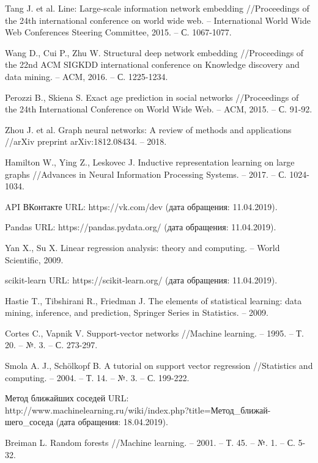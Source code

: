 \begin{thebibliography}{9}
Tang J. et al. Line: Large-scale information network embedding //Proceedings of the 24th international conference on world wide web. – International World Wide Web Conferences Steering Committee, 2015. – С. 1067-1077.

Wang D., Cui P., Zhu W. Structural deep network embedding //Proceedings of the 22nd ACM SIGKDD international conference on Knowledge discovery and data mining. – ACM, 2016. – С. 1225-1234.

Perozzi B., Skiena S. Exact age prediction in social networks //Proceedings of the 24th International Conference on World Wide Web. – ACM, 2015. – С. 91-92.

Zhou J. et al. Graph neural networks: A review of methods and applications //arXiv preprint arXiv:1812.08434. – 2018.

Hamilton W., Ying Z., Leskovec J. Inductive representation learning on large graphs //Advances in Neural Information Processing Systems. – 2017. – С. 1024-1034.

API ВКонтакте URL: https://vk.com/dev (дата обращения: 11.04.2019).

Pandas URL: https://pandas.pydata.org/ (дата обращения: 11.04.2019).

Yan X., Su X. Linear regression analysis: theory and computing. – World Scientific, 2009.

scikit-learn URL: https://scikit-learn.org/ (дата обращения: 11.04.2019).

Hastie T., Tibshirani R., Friedman J. The elements of statistical learning: data mining, inference, and prediction, Springer Series in Statistics. – 2009.

Cortes C., Vapnik V. Support-vector networks //Machine learning. – 1995. – Т. 20. – №. 3. – С. 273-297.

Smola A. J., Schölkopf B. A tutorial on support vector regression //Statistics and computing. – 2004. – Т. 14. – №. 3. – С. 199-222.

Метод ближайших соседей URL: \\
http://www.machinelearning.ru/wiki/index.php?title=Метод\_ближай-шего\_соседа (дата обращения: 18.04.2019).

Breiman L. Random forests //Machine learning. – 2001. – Т. 45. – №. 1. – С. 5-32.


\end{thebibliography}
